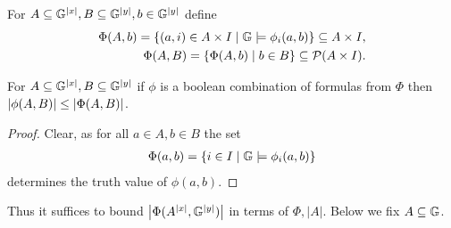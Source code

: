 \documentclass{amsart}
\begin{document}
\begin{Definition}
  For $A \subseteq \mathbb G^{|x|}, B \subseteq \mathbb G^{|y|}, b \in \mathbb G^{|y|}$ define
  \begin{align*}
    \Phi(A, b) = \left\{(a, i) \in A \times I \mid \mathbb G \models \phi_i(a, b) \right\} \subseteq A \times I, \\
    \Phi(A, B) = \left\{\Phi(A, b) \mid b \in B \right\} \subseteq \mathcal P(A \times I).
  \end{align*}  
\end{Definition}

\begin{Lemma}
  For $A \subseteq \mathbb G^{|x|}, B \subseteq \mathbb G^{|y|}$
  if $\phi$ is a boolean combination of formulas from $\Phi$ then
    $\left|\phi(A, B)\right| \leq \left|\Phi(A, B)\right|$.
\end{Lemma}
\begin{proof}
  Clear, as for all $a \in A, b \in B$ the set
  \begin{align*}
    \Phi(a, b) = \left\{i \in I \mid \mathbb G \models \phi_i(a, b)\right\}
  \end{align*}
  determines the truth value of $\phi(a,b)$.
\end{proof}

Thus it suffices to bound  $\left|\Phi(A^{|x|}, \mathbb G^{|y|})\right|$ in terms of $\Phi, |A|$.
Below we fix $A \subseteq \mathbb G$.
\end{document}
